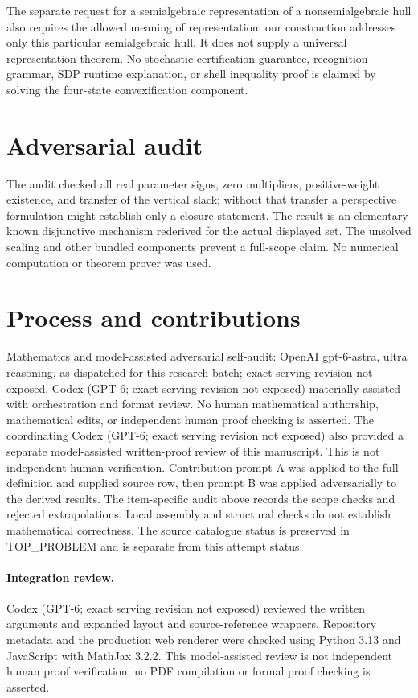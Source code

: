 \documentclass[11pt]{article}
\begin{document}
The separate request for a semialgebraic representation of a nonsemialgebraic
hull also requires the allowed meaning of representation: our construction
addresses only this particular semialgebraic hull. It does not supply a
universal representation theorem. No stochastic certification guarantee,
recognition grammar, SDP runtime explanation, or shell inequality proof is
claimed by solving the four-state convexification component.

\section{Adversarial audit}
The audit checked all real parameter signs, zero multipliers, positive-weight
existence, and transfer of the vertical slack; without that transfer a
perspective formulation might establish only a closure statement. The result
is an elementary known disjunctive mechanism rederived for the actual displayed
set. The unsolved scaling and other bundled components prevent a full-scope
claim. No numerical computation or theorem prover was used.

\section{Process and contributions}
Mathematics and model-assisted adversarial self-audit: OpenAI gpt-6-astra, ultra reasoning, as dispatched for this research batch; exact serving revision not exposed. Codex (GPT-6; exact serving revision not exposed) materially assisted with orchestration and format review. No human mathematical authorship, mathematical edits, or independent human proof checking is asserted.
The coordinating Codex (GPT-6; exact serving revision not exposed) also provided a separate model-assisted written-proof review of this manuscript. This is not independent human verification.
Contribution prompt A was applied to the full definition and supplied source row, then prompt B was applied adversarially to the derived results. The item-specific audit above records the scope checks and rejected extrapolations. Local assembly and structural checks do not establish mathematical correctness. The source catalogue status is preserved in TOP\_PROBLEM and is separate from this attempt status.
\paragraph{Integration review.} Codex (GPT-6; exact serving revision not exposed) reviewed the written arguments and expanded layout and source-reference wrappers. Repository metadata and the production web renderer were checked using Python 3.13 and JavaScript with MathJax 3.2.2. This model-assisted review is not independent human proof verification; no PDF compilation or formal proof checking is asserted.
\end{document}
